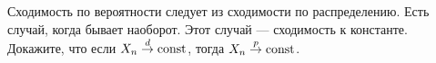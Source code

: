 \documentclass[12pt, a4paper, oneside]{article}
\begin{document}









\begin{problem}{}
Сходимость по вероятности следует из сходимости по распределению. Есть случай, когда бывает наоборот. Этот случай --- сходимость к константе. Докажите, что если $X_n \overset{d}{\to} \mathrm{const}$, тогда $X_n \overset{p}{\to} \mathrm{const}$.
\end{problem} 


\end{document}
